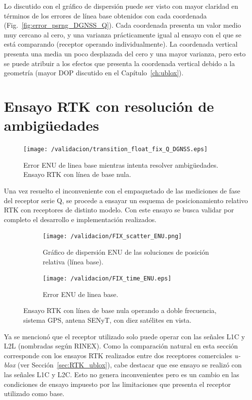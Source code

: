 \documentclass[a4paper,12pt,oneside,onecolumn,final,openright]{book}%
\begin{document}
	Lo discutido con el gráfico de dispersión puede ser visto con mayor claridad en términos de los errores de línea base obtenidos con cada coordenada (Fig.~\ref{fig:error_psrng_DGNSS_Q}). Cada coordenada presenta un valor medio muy cercano al cero, y una varianza prácticamente igual al ensayo con el que se está comparando (receptor operando individualmente). La coordenada vertical presenta una media un poco desplazada del cero y una mayor varianza, pero esto se puede atribuir a los efectos que presenta la coordenada vertical debido a la geometría (mayor DOP discutido en el Capítulo~\ref{ch:ublox}).
\section{Ensayo RTK con resolución de ambigüedades}
\begin{figure}[t]
\centering
 	\texttt{[image: /validacion/transition\_float\_fix\_Q\_DGNSS.eps]}
 	\caption{Error ENU de linea base mientras intenta resolver ambigüedades. Ensayo RTK con línea de base nula.}
  	\label{fig:trans_float_fix_DGNSS_Q}
\end{figure}
	Una vez resuelto el inconveniente con el empaquetado de las mediciones de fase del receptor serie Q, se procede a ensayar un esquema de posicionamiento relativo RTK con receptores de distinto modelo. Con este ensayo se busca validar por completo el desarrollo e implementación realizados.
\begin{figure}
\begin{subfigure}{1\linewidth}
\centering
  	\texttt{[image: /validacion/FIX\_scatter\_ENU.png]}
  	\caption{Gráfico de dispersión ENU de las soluciones de posición relativa (línea base).}
    \label{fig:scatter_fix_DGNSS_Q}
\end{subfigure}

\begin{subfigure}{1\linewidth}
\centering
 	\texttt{[image: /validacion/FIX\_time\_ENU.eps]}
 	\caption{Error ENU de linea base.}
  	\label{fig:error_fix_DGNSS_Q}
\end{subfigure}
\caption{Ensayo RTK con línea de base nula operando a doble frecuencia, sistema GPS, antena SENyT, con diez satélites en vista.}
\label{fig:ensayoDGNSS_fix_Q}
\end{figure}
	
	Ya se mencionó que el receptor utilizado solo puede operar con las señales L1C y L2L (nombradas según RINEX). Como la comparación natural en esta sección corresponde con los ensayos RTK realizados entre dos receptores comerciales \textit{u-blox} (ver Sección~\ref{sec:RTK_ublox}), cabe destacar que ese ensayo se realizó con las señales L1C y L2C. Esto no genera inconvenientes pero es un cambio en las condiciones de ensayo impuesto por las limitaciones que presenta el receptor utilizado como base.
	
\end{document}
